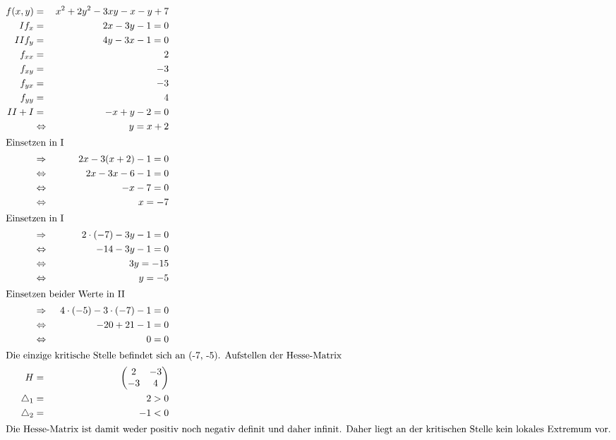 \documentclass[10pt,a4paper,oneside,ngerman,numbers=noenddot]{scrartcl}
\begin{document}
\subsubsection{} %
\begin{alignat*}{2}
f(x,y) &=& x^{2} + 2y^{2} - 3xy -x -y +7 \\
I f_{x} &=& 2x - 3y - 1 = 0 \\
II f_{y} &=& 4y - 3x - 1 = 0 \\
f_{xx} &=& 2 \\
f_{xy} &=& -3 \\
f_{yx} &=& -3 \\
f_{yy} &=& 4 \\
II + I &=& -x + y -2 = 0 \\
&\Leftrightarrow & y = x + 2 \\
\intertext{Einsetzen in I}
&\Rightarrow & 2x - 3(x+2) - 1 = 0 \\
&\Leftrightarrow & 2x - 3x - 6 - 1 = 0 \\
&\Leftrightarrow & -x - 7 = 0 \\
&\Leftrightarrow & x = -7 \\
\intertext{Einsetzen in I}
&\Rightarrow & 2 \cdot (-7) - 3y - 1 = 0 \\
&\Leftrightarrow & -14 - 3y - 1 = 0 \\
&\Leftrightarrow & 3y = -15 \\
&\Leftrightarrow & y = -5 \\
\intertext{Einsetzen beider Werte in II}
&\Rightarrow & 4 \cdot (-5) - 3 \cdot (-7) - 1 = 0 \\
&\Leftrightarrow & -20 + 21 - 1 = 0 \\
&\Leftrightarrow & 0 = 0 \\
\intertext{Die einzige kritische Stelle befindet sich an (-7, -5). Aufstellen der Hesse-Matrix}
H &=& \begin{pmatrix} 2 & -3 \\
-3 & 4 \end{pmatrix} \\
\bigtriangleup_{1} &=& 2 > 0 \\
\bigtriangleup_{2} &=& -1 < 0 \\
\intertext{Die Hesse-Matrix ist damit weder positiv noch negativ definit und daher infinit. Daher liegt an der kritischen Stelle kein lokales Extremum vor.}
\end{alignat*}
\end{document}
